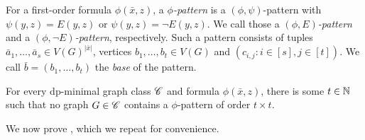 \begin{definition}
    For a first-order formula $\phi(\bar x,z)$, a \emph{$\phi$-pattern} is a $(\phi,\psi)$-pattern
    with $\psi(y,z)=E(y,z)$ or $\psi(y,z)=\neg E(y,z)$.
    We call those a
    \emph{$(\phi,E)$-pattern} 
    and a \emph{$(\phi,\neg E)$-pattern}, respectively.
    Such a pattern consists of tuples $\bar a_1,\ldots,\bar a_s\in V(G)^{|\bar x|}$,
    vertices $b_1,\ldots,b_t\in V(G)$ and $(c_{i,j}:i\in[s],j\in [t])$.
    We call $\bar b=(b_1,\ldots,b_t)$
    the \emph{base} of the pattern. 
\end{definition}

\begin{corollary}\label{lem:forbidden-patterns}
        For every dp-minimal graph class $\mathscr C$ and formula $\phi(\bar x,z)$, there is some $t\in \mathbb N$ such that no graph $G\in \mathscr C$ contains a $\phi$-pattern of order $t \times t$.
\end{corollary}


We now prove , which we repeat for convenience.

